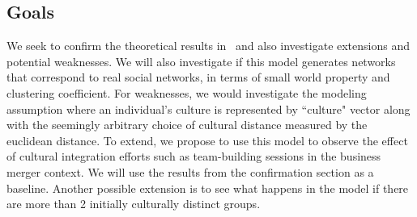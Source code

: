 \subsection{Goals}\label{subsec:goals}
    We seek to confirm the theoretical results in~\cite{social-frag} and also
    investigate extensions and potential weaknesses.
    We will also investigate if this model generates networks that correspond
    to real social networks, in terms of small world property and clustering
    coefficient.
    For weaknesses, we would investigate the modeling assumption where an individual's
    culture is represented by ``culture" vector along with
    the seemingly arbitrary choice of cultural distance measured by the
    euclidean distance.
    To extend, we propose to use this model to observe the effect of cultural integration
    efforts such as team-building sessions in the business merger context.
    We will use the results from the confirmation section as a baseline.
    Another possible extension is to see what happens in the model if there are more
    than 2 initially culturally distinct groups.